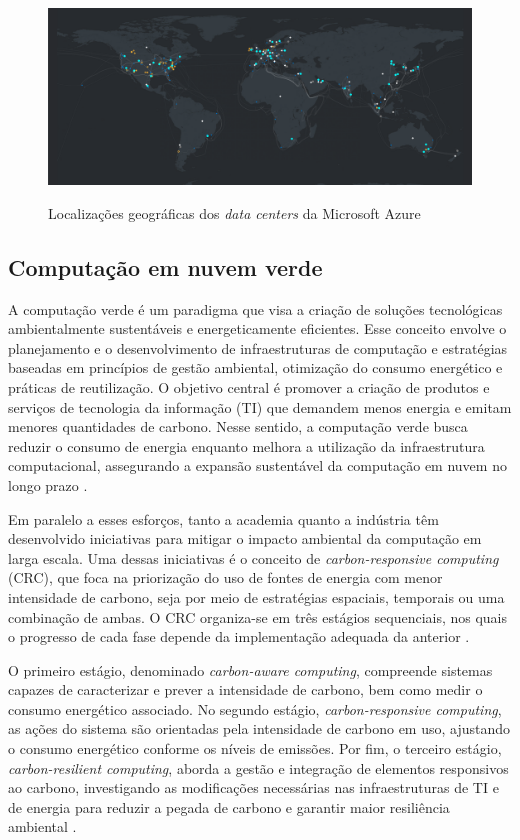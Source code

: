 \documentclass[
	12pt,				%
	oneside,			%
	a4paper,			%
	english,			%
	brazil				%
	]{abntex2ppgsi}
\begin{document}
\begin{figure}[htbp]
	\centering
	\caption{Localizações geográficas dos \textit{data centers} da Microsoft Azure}
		\includegraphics[width=\linewidth]{images/microsoft-datacenters.png}
	\label{fig:microsoft-datacenters}
\end{figure}

\subsection{Computação em nuvem verde}

A computação verde é um paradigma que visa a criação de soluções tecnológicas ambientalmente sustentáveis e energeticamente eficientes. Esse conceito envolve o planejamento e o desenvolvimento de infraestruturas de computação e estratégias baseadas em princípios de gestão ambiental, otimização do consumo energético e práticas de reutilização. O objetivo central é promover a criação de produtos e serviços de tecnologia da informação (TI) que demandem menos energia e emitam menores quantidades de carbono. Nesse sentido, a computação verde busca reduzir o consumo de energia enquanto melhora a utilização da infraestrutura computacional, assegurando a expansão sustentável da computação em nuvem no longo prazo \cite{9793067}.

Em paralelo a esses esforços, tanto a academia quanto a indústria têm desenvolvido iniciativas para mitigar o impacto ambiental da computação em larga escala. Uma dessas iniciativas é o conceito de \textit{carbon-responsive computing} (CRC), que foca na priorização do uso de fontes de energia com menor intensidade de carbono, seja por meio de estratégias espaciais, temporais ou uma combinação de ambas. O CRC organiza-se em três estágios sequenciais, nos quais o progresso de cada fase depende da implementação adequada da anterior \cite{en14216917}.

O primeiro estágio, denominado \textit{carbon-aware computing}, compreende sistemas capazes de caracterizar e prever a intensidade de carbono, bem como medir o consumo energético associado. No segundo estágio, \textit{carbon-responsive computing}, as ações do sistema são orientadas pela intensidade de carbono em uso, ajustando o consumo energético conforme os níveis de emissões. Por fim, o terceiro estágio, \textit{carbon-resilient computing}, aborda a gestão e integração de elementos responsivos ao carbono, investigando as modificações necessárias nas infraestruturas de TI e de energia para reduzir a pegada de carbono e garantir maior resiliência ambiental \cite{en14216917}.
\end{document}
